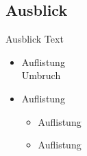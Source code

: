 \documentclass{sdqbeamer}
\begin{document}
\subsection{Ausblick}
\begin{frame}{Ausblick}
	Text
	\begin{itemize}
		\item Auflistung\\ Umbruch
		\item Auflistung
		\begin{itemize}
			\item Auflistung
			\item Auflistung
		\end{itemize}
	\end{itemize}
\end{frame}


\end{document}

